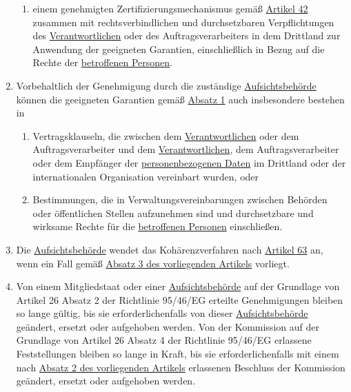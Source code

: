 \begin{enumerate}
\begin{enumerate}
    \item einem genehmigten Zertifizierungsmechanismus gemäß \hyperref[ch:42]{Artikel 42} zusammen mit
     rechtsverbindlichen und durchsetzbaren Verpflichtungen des \hyperref[itm:04-7]{Verantwortlichen} oder des Auftragsverarbeiters in dem
     Drittland zur Anwendung der geeigneten Garantien, einschließlich in Bezug auf die Rechte der \hyperref[itm:04-1]{betroffenen
     Personen}.
    \label{itm:46-2f}

  \end{enumerate}

  \item Vorbehaltlich der Genehmigung durch die zuständige \hyperref[itm:04-21]{Aufsichtsbehörde} können die geeigneten Garantien gemäß
   \hyperref[itm:46-1]{Absatz 1} auch insbesondere bestehen in
  \label{itm:46-3}

  \begin{enumerate}
  
    \item Vertragsklauseln, die zwischen dem \hyperref[itm:04-7]{Verantwortlichen} oder dem Auftragsverarbeiter und dem \hyperref[itm:04-7]{Verantwortlichen}, dem
     Auftragsverarbeiter oder dem Empfänger der \hyperref[itm:04-1]{personenbezogenen Daten} im Drittland oder der internationalen
     Organisation vereinbart wurden, oder
    \label{itm:46-3a}

    \item Bestimmungen, die in Verwaltungsvereinbarungen zwischen Behörden oder öffentlichen Stellen aufzunehmen sind
     und durchsetzbare und wirksame Rechte für die \hyperref[itm:04-1]{betroffenen Personen} einschließen.
    \label{itm:46-3b}

  \end{enumerate}

  \item Die \hyperref[itm:04-21]{Aufsichtsbehörde} wendet das Kohärenzverfahren nach \hyperref[ch:63]{Artikel 63} an, wenn ein Fall gemäß
   \hyperref[itm:46-3]{Absatz 3 des vorliegenden Artikels} vorliegt.
  \label{itm:46-4}

  \item Von einem Mitgliedstaat oder einer \hyperref[itm:04-21]{Aufsichtsbehörde} auf der Grundlage von Artikel 26 Absatz 2 der Richtlinie
   95/46/EG erteilte Genehmigungen bleiben so lange gültig, bis sie erforderlichenfalls von dieser
   \hyperref[itm:04-21]{Aufsichtsbehörde} geändert, ersetzt oder aufgehoben werden. Von der Kommission auf der Grundlage von Artikel 26
   Absatz 4 der Richtlinie 95/46/EG erlassene Feststellungen bleiben so lange in Kraft, bis sie erforderlichenfalls mit
   einem nach \hyperref[itm:46-2]{Absatz 2 des vorliegenden Artikels} erlassenen Beschluss der Kommission geändert,
   ersetzt oder aufgehoben werden.
  \label{itm:46-5}

\end{enumerate}


